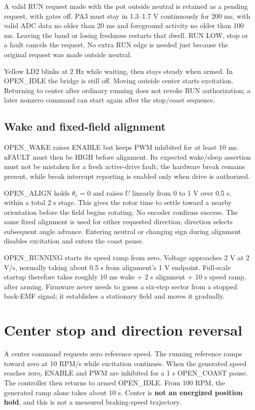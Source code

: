 \documentclass[11pt,letterpaper]{article}
\begin{document}
A valid RUN request made with the pot outside neutral is retained as a pending
request, with gates off. PA3 must stay in 1.3--1.7 V continuously for 200 ms,
with valid ADC data no older than 20 ms and foreground activity no older than
100 ms. Leaving the band or losing freshness restarts that dwell.
RUN LOW, stop or a fault cancels the request. No extra RUN edge is needed just
because the original request was made outside neutral.

Yellow LD2 blinks at 2 Hz while waiting, then stays steady when armed.
In OPEN\_IDLE the bridge is still off. Moving outside center starts excitation.
Returning to center after ordinary running does not revoke RUN authorization;
a later nonzero command can start again after the stop/coast sequence.

\subsection{Wake and fixed-field alignment}

OPEN\_WAKE raises ENABLE but keeps PWM inhibited for at least 10 ms. nFAULT
must then be HIGH before alignment. Its expected wake/sleep assertion must not
be mistaken for a fresh active-drive fault; the hardware break remains present,
while break interrupt reporting is enabled only when drive is authorized.

OPEN\_ALIGN holds $\theta_e=0$ and raises $U$ linearly from 0 to 1 V over
0.5 s, within a total 2 s stage. This gives the rotor time to settle toward a
nearby orientation before the field begins rotating. No encoder confirms
success. The same fixed alignment is used for either requested direction;
direction selects subsequent angle advance. Entering neutral or changing sign
during alignment disables excitation and enters the coast pause.

OPEN\_RUNNING starts its speed ramp from zero. Voltage approaches 2 V at
2 V/s, normally taking about 0.5 s from alignment's 1 V endpoint. Full-scale
startup therefore takes roughly 10 ms wake + 2 s alignment + 10 s speed ramp,
after arming. Firmware never needs to guess a six-step sector from a stopped
back-EMF signal; it establishes a stationary field and moves it gradually.

\section{Center stop and direction reversal}

A center command requests zero reference speed. The running reference ramps
toward zero at 10 RPM/s while excitation continues. When the generated speed
reaches zero, ENABLE and PWM are inhibited for a 1 s OPEN\_COAST pause.
The controller then returns to armed OPEN\_IDLE. From 100 RPM, the generated
ramp alone takes about 10 s. Center is \textbf{not an energized position hold},
and this is not a measured braking-speed trajectory.
\end{document}
